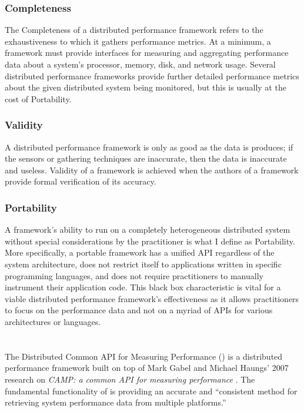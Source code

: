 \subsubsection{Completeness}

The Completeness of a distributed performance framework refers to the exhaustiveness to which it gathers performance
metrics. At a minimum, a framework must provide interfaces for measuring and aggregating performance data about a
system's processor, memory, disk, and network usage. Several distributed performance frameworks provide further detailed
performance metrics about the given distributed system being monitored, but this is usually at the cost of Portability.

\subsubsection{Validity}

A distributed performance framework is only as good as the data is produces; if the sensors or gathering techniques are
inaccurate, then the data is inaccurate and useless. Validity of a framework is achieved when the authors of a framework
provide formal verification of its accuracy.

\subsubsection{Portability}

A framework's ability to run on a completely heterogeneous distributed system without special considerations by the
practitioner is what I define as Portability. More specifically, a portable framework has a unified API regardless of
the system architecture, does not restrict itself to applications written in specific programming languages, and does
not require practitioners to manually instrument their application code. This black box characteristic is vital for a
viable distributed performance framework's effectiveness as it allows practitioners to focus on the performance data and
not on a myriad of APIs for various architectures or languages.

\section{\dcamp}
\label{dcamp}

The Distributed Common API for Measuring Performance (\dcampns) is a distributed performance framework built on top of
Mark Gabel and Michael Haungs' 2007 research on \emph{CAMP: a common API for measuring performance} \cite{gabel2007}.
The fundamental functionality of \camp is providing an accurate and ``consistent method for retrieving system
performance data from multiple platforms.''

